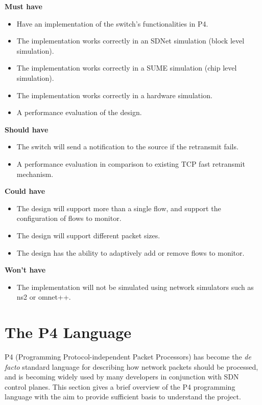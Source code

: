 \textbf{Must have}
\begin{itemize}
	\item Have an implementation of the switch's functionalities in P4. 
	\item The implementation works correctly in an SDNet simulation (block level simulation).
	\item The implementation works correctly in a SUME simulation (chip level simulation).
	\item The implementation works correctly in a hardware simulation.
	\item A performance evaluation of the design.
\end{itemize}

\textbf{Should have}
\begin{itemize}
	\item The switch will send a notification to the source if the retransmit fails.
	\item A performance evaluation in comparison to existing TCP fast retransmit mechanism.
\end{itemize}

\textbf{Could have}
\begin{itemize}
	\item The design will support more than a single flow, and support the configuration of flows to monitor.
	\item The design will support different packet sizes.
	\item The design has the ability to adaptively add or remove flows to monitor.
\end{itemize}

\textbf{Won't have}
\begin{itemize}
	\item The implementation will not be simulated using network simulators such as ns2 or omnet++.
\end{itemize}

\section{The P4 Language}
P4 (Programming Protocol-independent Packet Processors) has become the \textit{de facto} standard language for describing how network packets should be processed, and is becoming widely used by many developers in  conjunction with SDN control planes. This section gives a brief overview of the P4 programming language with the aim to provide sufficient basis to understand the project.

